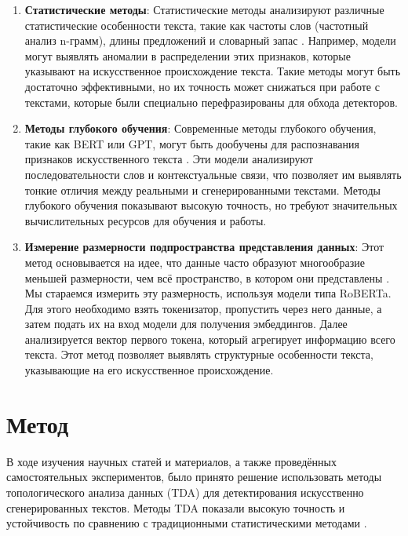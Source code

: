 \documentclass{math-mech-sci}
\begin{document}
\begin{enumerate}
    \item \textbf{Статистические методы}:
    Статистические методы анализируют различные статистические особенности текста, такие как частоты слов (частотный анализ n-грамм), длины предложений и словарный запас \cite{gehrmann2019gltr}. Например, модели могут выявлять аномалии в распределении этих признаков, которые указывают на искусственное происхождение текста. Такие методы могут быть достаточно эффективными, но их точность может снижаться при работе с текстами, которые были специально перефразированы для обхода детекторов.

    \item \textbf{Методы глубокого обучения}:
    Современные методы глубокого обучения, такие как BERT или GPT, могут быть дообучены для распознавания признаков искусственного текста \cite{guo2023how}. Эти модели анализируют последовательности слов и контекстуальные связи, что позволяет им выявлять тонкие отличия между реальными и сгенерированными текстами. Методы глубокого обучения показывают высокую точность, но требуют значительных вычислительных ресурсов для обучения и работы.

    \item \textbf{Измерение размерности подпространства представления данных}:
    Этот метод основывается на идее, что данные часто образуют многообразие меньшей размерности, чем всё пространство, в котором они представлены \cite{tulchinskii2023intrinsic}. Мы стараемся измерить эту размерность, используя модели типа RoBERTa. Для этого необходимо взять токенизатор, пропустить через него данные, а затем подать их на вход модели для получения эмбеддингов. Далее анализируется вектор первого токена, который агрегирует информацию всего текста. Этот метод позволяет выявлять структурные особенности текста, указывающие на его искусственное происхождение.
\end{enumerate}


\section{Метод}
В ходе изучения научных статей и материалов, а также проведённых самостоятельных экспериментов, было принято решение использовать методы топологического анализа данных (TDA) для детектирования искусственно сгенерированных текстов. Методы TDA показали высокую точность и устойчивость по сравнению с традиционными статистическими методами \cite{tulchinskii2023intrinsic}.
\end{document}
